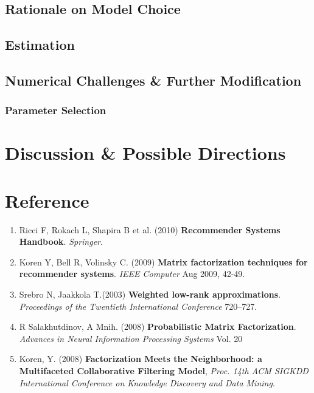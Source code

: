 \documentclass[11pt]{article}
\theoremstyle{definition}
\begin{document}
\subsection{\textbf{Rationale on Model Choice}}

\subsection{\textbf{Estimation}}\label{sec:estimation}

\subsection{\textbf{Numerical Challenges \& Further Modification}}

\subsubsection{Parameter Selection}

\newpage
\section{\textbf{Discussion \& Possible Directions}}


\newpage
\section*{\textbf{Reference}}
\begin{enumerate}
\item \label{ref:handbook}
Ricci F, Rokach L, Shapira B et al. (2010) \textbf{Recommender Systems Handbook}. \textit{Springer}. 
\item \label{ref:MFieee}
Koren Y, Bell R, Volinsky C. (2009) \textbf{Matrix factorization techniques for recommender systems}. \textit{IEEE Computer} Aug 2009, 42-49. 
\item \label{ref:WLA}
Srebro N,  Jaakkola T.(2003) \textbf{Weighted low-rank approximations}. \textit{Proceedings of the Twentieth International Conference} 720–727.
\item \label{ref:PMF}
R Salakhutdinov, A Mnih. (2008) \textbf{Probabilistic Matrix Factorization}. \textit{Advances in Neural Information Processing Systems} Vol. 20

\item \label{ref:implicit}
Koren, Y. (2008) \textbf{Factorization Meets the Neighborhood: a Multifaceted Collaborative Filtering Model}, \textit{Proc. 14th ACM SIGKDD International Conference on Knowledge Discovery and
Data Mining}.

\end{enumerate}
\end{document}
